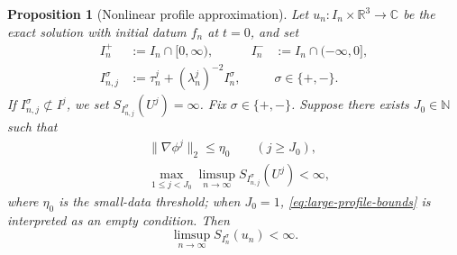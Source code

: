 \documentclass{interact}
\numberwithin{equation}{section}
\theoremstyle{plain}
\newtheorem{proposition}[theorem]{Proposition}
\theoremstyle{definition}
\theoremstyle{remark}
\newcommand{\R}{\mathbb R}
\newcommand{\C}{\mathbb C}
\begin{document}
\begin{proposition}[Nonlinear profile approximation]
Let $u_n:I_n\times\R^3\to\C$ be the exact solution with initial datum $f_n$ at $t=0$, and set
\begin{align*}
 I_n^+&:=I_n\cap[0,\infty),
 &I_n^-&:=I_n\cap(-\infty,0],\\
 I_{n,j}^\sigma
 &:=\tau_n^j+(\lambda_n^j)^{-2}I_n^\sigma,
 &&\sigma\in\{+,-\}.
\end{align*}
If $I_{n,j}^\sigma\not\subset I^j$, we set $S_{I_{n,j}^\sigma}(U^j)=\infty$. Fix $\sigma\in\{+,-\}$. Suppose there exists $J_0\in\mathbb N$ such that
\begin{align}
 &\|\nabla\phi^j\|_2\le\eta_0
 \qquad(j\ge J_0),
 \label{eq:profile-small-tail}\\
 &\max_{1\le j<J_0}
 \limsup_{n\to\infty}S_{I_{n,j}^\sigma}(U^j)<\infty,
 \label{eq:large-profile-bounds}
\end{align}
where $\eta_0$ is the small-data threshold; when $J_0=1$, \eqref{eq:large-profile-bounds} is interpreted as an empty condition. Then
\begin{equation}\label{eq:profile-stability-consequence}
 \limsup_{n\to\infty}S_{I_n^\sigma}(u_n)<\infty.
\end{equation}
\end{proposition}
\end{document}
